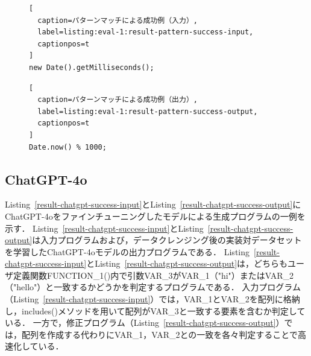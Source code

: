 \documentclass[11pt]{jreport}
\begin{document}
\begin{figure}[t]
\captionsetup{name=Listing}
\hspace{0.04\columnwidth}
\begin{minipage}[b]{0.96\linewidth}
\begin{lstlisting}[
  caption=パターンマッチによる成功例（入力）,
  label=listing:eval-1:result-pattern-success-input,
  captionpos=t
]
new Date().getMilliseconds();
\end{lstlisting}
\end{minipage}

\hspace{0.04\columnwidth}
\begin{minipage}[b]{0.96\linewidth}
\begin{lstlisting}[
  caption=パターンマッチによる成功例（出力）,
  label=listing:eval-1:result-pattern-success-output,
  captionpos=t
]
Date.now() % 1000;
\end{lstlisting}
\end{minipage}
\end{figure}




\subsection{ChatGPT-4o}


Listing~\ref{result-chatgpt-success-input}とListing~\ref{result-chatgpt-success-output}にChatGPT-4oをファインチューニングしたモデルによる生成プログラムの一例を示す．
Listing~\ref{result-chatgpt-success-input}とListing~\ref{result-chatgpt-success-output}は入力プログラムおよび，データクレンジング後の実装対データセットを学習したChatGPT-4oモデルの出力プログラムである．
Listing~\ref{result-chatgpt-success-input}とListing~\ref{result-chatgpt-success-output}は，どちらもユーザ定義関数FUNCTION\_1()内で引数VAR\_3がVAR\_1（"hi"）またはVAR\_2（"hello"）と一致するかどうかを判定するプログラムである．
入力プログラム（Listing~\ref{result-chatgpt-success-input}）では，VAR\_1とVAR\_2を配列に格納し，includes()メソッドを用いて配列がVAR\_3と一致する要素を含むか判定している．
一方で，修正プログラム（Listing~\ref{result-chatgpt-success-output}）では，配列を作成する代わりにVAR\_1，VAR\_2との一致を各々判定することで高速化している．
\end{document}
